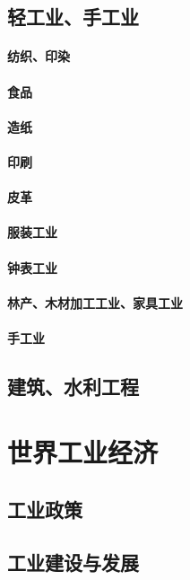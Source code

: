 \documentclass[UTF8]{../../RepresentationUniverse}
\begin{document}
\section{轻工业、手工业}
    \subsubsection{纺织、印染}
    \subsubsection{食品}
    \subsubsection{造纸}
    \subsubsection{印刷}
    \subsubsection{皮革}
    \subsubsection{服装工业}
    \subsubsection{钟表工业}
    \subsubsection{林产、木材加工工业、家具工业}
    \subsubsection{手工业}
\section{建筑、水利工程}




\chapter{世界工业经济}
\section{工业政策}
\section{工业建设与发展}
\end{document}
